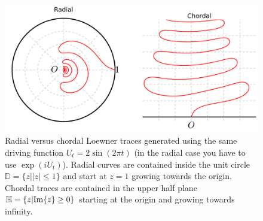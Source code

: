 \begin{figure}
\begin{center}
    \includegraphics[scale=0.4]{chapters/ch4-sle/figs/radchord}
\end{center}
\caption{Radial versus chordal Loewner traces generated using the same driving
    function $U_t=2\sin(2\pi t)$ (in the radial case you have to use
    $\exp(iU_t)$). Radial curves are contained inside the unit circle
    $\mathbb{D}=\{z||z|\leq1\}$ and start at $z=1$ growing towards the origin.
    Chordal traces are contained in the upper half plane
    $\mathbb{H}=\{z|\mbox{Im}\{z\}\geq0\}$ starting at the origin and growing towards
    infinity.}
\label{fig:radchord}
\end{figure}

